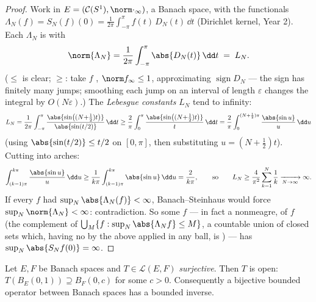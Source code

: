 \begin{proof}
Work in $E = (\mathcal C(S^1), \norm\cdot_\infty)$, a Banach
space, with the functionals $\Lambda_N(f) = S_N(f)(0) =
\frac1{2\pi}\int_{-\pi}^{\pi}f(t)\,D_N(t)\,\dd t$ (Dirichlet
kernel, Year 2). Each $\Lambda_N$ is  with
\[
\norm{\Lambda_N} = \frac1{2\pi}\int_{-\pi}^\pi\abs{D_N(t)}\,\dd
t \;=\; L_N .
\]
($\leq$ is clear; $\geq$: take $f$ , $\norm f_\infty
\leq 1$, approximating $\operatorname{sign}D_N$ --- the sign
has finitely many jumps; smoothing each jump on an interval of
length $\varepsilon$ changes the integral by $O(N\varepsilon)$.)
The \emph{Lebesgue constants} $L_N$ tend to infinity:
\[
L_N = \frac1{2\pi}\int_{-\pi}^{\pi}
\frac{\abs{\sin\bigl((N{+}\tfrac12)t\bigr)}}{\abs{\sin(t/2)}}
\,\dd t
\geq \frac{2}{\pi}\int_0^{\pi}
\frac{\abs{\sin\bigl((N{+}\tfrac12)t\bigr)}}{t}\,\dd t
= \frac{2}{\pi}\int_0^{(N+\frac12)\pi}\frac{\abs{\sin
u}}{u}\,\dd u
\]
(using $\abs{\sin(t/2)} \leq t/2$ on $[0, \pi]$, then
substituting $u = (N + \tfrac12)t$). Cutting into arches:
\[
\int_{(k-1)\pi}^{k\pi}\frac{\abs{\sin u}}u\,\dd u
\geq \frac1{k\pi}\int_{(k-1)\pi}^{k\pi}\abs{\sin u}\,\dd u =
\frac{2}{k\pi},
\qquad\text{so}\qquad
L_N \geq \frac{4}{\pi^2}\sum_{k=1}^N\frac1k
\xrightarrow[N\to\infty]{} \infty .
\]
If every  $f$ had $\sup_N
\abs{\Lambda_N(f)} < \infty$, Banach--Steinhaus would force
$\sup_N\norm{\Lambda_N} < \infty$: contradiction. So some $f$
--- in fact a nonmeagre,  of $f$ (the complement of
$\bigcup_M\{f: \sup_N\abs{\Lambda_Nf}\leq M\}$, a countable
union of closed sets which, having no  by the above
applied in any ball, is ) --- has $\sup_N\abs{S_Nf(0)} =
\infty$.
\end{proof}

\begin{theorem}\label{thm:b3:banach:openmapping}
Let $E, F$ be Banach spaces and $T \in \mathcal L(E, F)$
\emph{surjective}. Then $T$ is open: $T(B_E(0,1)) \supseteq
B_F(0, c)$ for some $c > 0$. Consequently a bijective bounded
operator between Banach spaces has a bounded
inverse.
\end{theorem}

